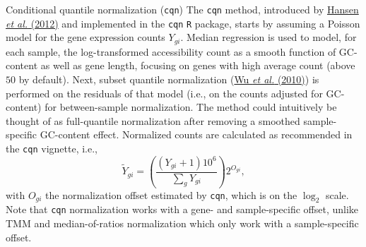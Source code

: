 \documentclass[ignorenonframetext,]{beamer}
\begin{document}
\begin{frame}[fragile]
\begin{block}{Conditional quantile normalization (\texttt{cqn})}
The \texttt{cqn} method, introduced by
\href{https://academic.oup.com/biostatistics/article/13/2/204/1746212}{Hansen
\emph{et al.} (2012)} and implemented in the \texttt{cqn} \texttt{R}
package, starts by assuming a Poisson model for the gene expression
counts \(Y_{gi}\). Median regression is used to model, for each sample,
the log-transformed accessibility count as a smooth function of
GC-content as well as gene length, focusing on genes with high average
count (above \(50\) by default). Next, subset quantile normalization
(\href{https://www.liebertpub.com/doi/10.1089/cmb.2010.0049}{Wu \emph{et
al.} (2010)}) is performed on the residuals of that model (i.e., on the
counts adjusted for GC-content) for between-sample normalization. The
method could intuitively be thought of as full-quantile normalization
after removing a smoothed sample-specific GC-content effect. Normalized
counts are calculated as recommended in the \texttt{cqn} vignette, i.e.,
\[
\tilde{Y}_{gi} = \left(\frac{(Y_{gi}+1) 10^6}{\sum_g Y_{gi}}\right)  2^{O_{gi}},
\] with \(O_{gi}\) the normalization offset estimated by \texttt{cqn},
which is on the \(\log_2\) scale. Note that \texttt{cqn} normalization
works with a gene- and sample-specific offset, unlike TMM and
median-of-ratios normalization which only work with a sample-specific
offset.

\end{block}

\end{frame}
\end{document}
